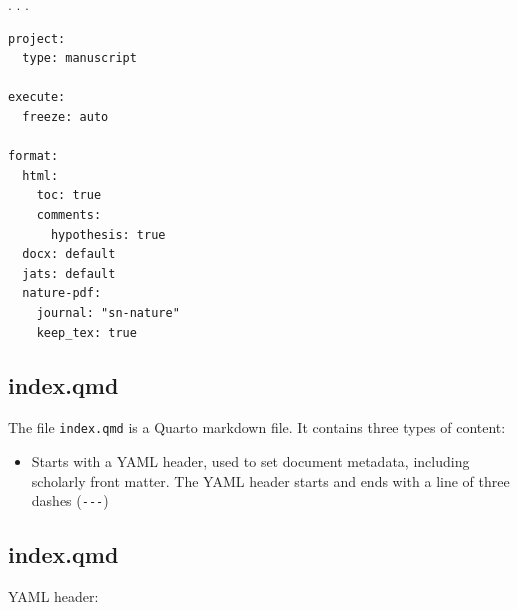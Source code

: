 \documentclass[
  letterpaper,
  DIV=11,
  numbers=noendperiod]{scrartcl}
\providecommand{\tightlist}{%
  \setlength{\itemsep}{0pt}\setlength{\parskip}{0pt}}\usepackage{longtable,booktabs,array}
\begin{document}
. . .

\begin{verbatim}
project:
  type: manuscript

execute:
  freeze: auto

format:
  html:
    toc: true
    comments:
      hypothesis: true
  docx: default
  jats: default
  nature-pdf:
    journal: "sn-nature"
    keep_tex: true
\end{verbatim}

\subsection{index.qmd}\label{index.qmd}

The file \texttt{index.qmd} is a Quarto markdown file. It contains three
types of content:

\begin{itemize}
\tightlist
\item
  Starts with a YAML header, used to set document metadata, including
  scholarly front matter. The YAML header starts and ends with a line of
  three dashes (\texttt{-\/-\/-})
\end{itemize}

\subsection{index.qmd}\label{index.qmd-1}

YAML header:
\end{document}
